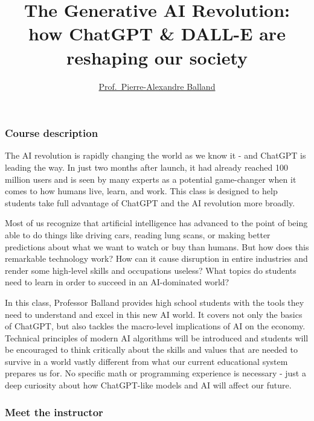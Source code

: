 \documentclass[
]{article}
\title{The Generative AI Revolution: how ChatGPT \& DALL-E are reshaping
our society}
\author{\href{https://www.paballand.com/}{Prof.~Pierre-Alexandre
Balland}}
\date{}
\begin{document}
\maketitle

\hypertarget{course-description}{%
\subsubsection{Course description}\label{course-description}}

The AI revolution is rapidly changing the world as we know it - and
ChatGPT is leading the way. In just two months after launch, it had
already reached 100 million users and is seen by many experts as a
potential game-changer when it comes to how humans live, learn, and
work. This class is designed to help students take full advantage of
ChatGPT and the AI revolution more broadly.

Most of us recognize that artificial intelligence has advanced to the
point of being able to do things like driving cars, reading lung scans,
or making better predictions about what we want to watch or buy than
humans. But how does this remarkable technology work? How can it cause
disruption in entire industries and render some high-level skills and
occupations useless? What topics do students need to learn in order to
succeed in an AI-dominated world?

In this class, Professor Balland provides high school students with the
tools they need to understand and excel in this new AI world. It covers
not only the basics of ChatGPT, but also tackles the macro-level
implications of AI on the economy. Technical principles of modern AI
algorithms will be introduced and students will be encouraged to think
critically about the skills and values that are needed to survive in a
world vastly different from what our current educational system prepares
us for. No specific math or programming experience is necessary - just a
deep curiosity about how ChatGPT-like models and AI will affect our
future.

\hypertarget{meet-the-instructor}{%
\subsubsection{Meet the instructor}\label{meet-the-instructor}}
\end{document}
